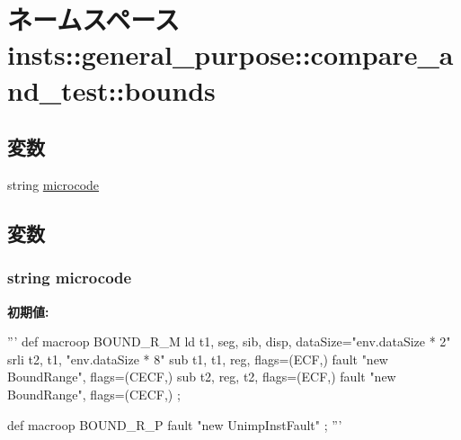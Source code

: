 \hypertarget{namespaceinsts_1_1general__purpose_1_1compare__and__test_1_1bounds}{
\section{ネームスペース insts::general\_\-purpose::compare\_\-and\_\-test::bounds}
\label{namespaceinsts_1_1general__purpose_1_1compare__and__test_1_1bounds}
}
\subsection*{変数}
\begin{DoxyCompactItemize}
\item 
string \hyperlink{namespaceinsts_1_1general__purpose_1_1compare__and__test_1_1bounds_a770f11a173e99389a8802f0107ed8f52}{microcode}
\end{DoxyCompactItemize}


\subsection{変数}
\hypertarget{namespaceinsts_1_1general__purpose_1_1compare__and__test_1_1bounds_a770f11a173e99389a8802f0107ed8f52}{
\subsubsection[{microcode}]{\setlength{\rightskip}{0pt plus 5cm}string {\bf microcode}}}
\label{namespaceinsts_1_1general__purpose_1_1compare__and__test_1_1bounds_a770f11a173e99389a8802f0107ed8f52}
{\bfseries 初期値:}
\begin{DoxyCode}
'''
def macroop BOUND_R_M {
    ld t1, seg, sib, disp, dataSize="env.dataSize * 2"
    srli t2, t1, "env.dataSize * 8"
    sub t1, t1, reg, flags=(ECF,)
    fault "new BoundRange", flags=(CECF,)
    sub t2, reg, t2, flags=(ECF,)
    fault "new BoundRange", flags=(CECF,)
};

def macroop BOUND_R_P {
    fault "new UnimpInstFault"
};
'''
\end{DoxyCode}
